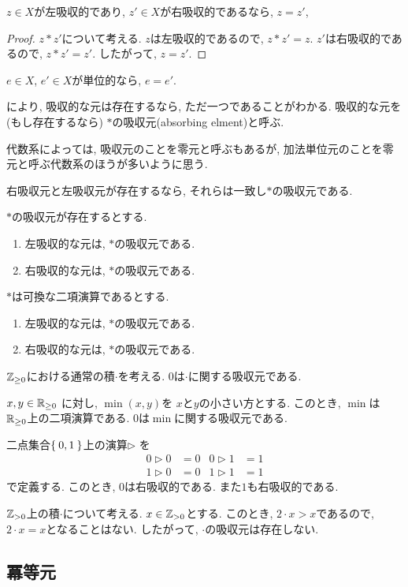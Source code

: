\begin{lemma}
  $z\in X$が左吸収的であり,
  $z'\in X$が右吸収的であるなら,
  $z=z'$,
\end{lemma}
\begin{proof}
  $z\ast z'$について考える.
  $z$は左吸収的であるので, $z\ast z'=z$.
  $z'$は右吸収的であるので, $z\ast z'=z'$.
  したがって, $z=z'$.
\end{proof}
\begin{cor}
\label{cor:uniq:absorbinelm}
  $e\in X$, $e'\in X$が単位的なら,
  $e=e'$.
\end{cor}
\begin{remark}
  により,
  吸収的な元は存在するなら, ただ一つであることがわかる.
  吸収的な元を (もし存在するなら)
  $\ast$の吸収元(absorbing elment)と呼ぶ.

  代数系によっては, 吸収元のことを零元と呼ぶもあるが,
  加法単位元のことを零元と呼ぶ代数系のほうが多いように思う.
\end{remark}
\begin{cor}
  右吸収元と左吸収元が存在するなら,
  それらは一致し$\ast$の吸収元である.
\end{cor}
\begin{cor}
  $\ast$の吸収元が存在するとする.
  \begin{enumerate}
  \item 左吸収的な元は, $\ast$の吸収元である.
  \item 右吸収的な元は, $\ast$の吸収元である.
  \end{enumerate}
\end{cor}
\begin{cor}
  $\ast$は可換な二項演算であるとする.
  \begin{enumerate}
  \item 左吸収的な元は, $\ast$の吸収元である.
  \item 右吸収的な元は, $\ast$の吸収元である.
  \end{enumerate}
\end{cor}
\begin{example}
  $\mathbb{Z}_{\geq 0}$における通常の積$\cdot$を考える.
  $0$は$\cdot$に関する吸収元である.
\end{example}
\begin{example}
  $x,y\in\mathbb{R}_{\geq 0}$
  に対し, $\min(x,y)$を
  $x$と$y$の小さい方とする.
  このとき, $\min$は
  $\mathbb{R}_{\geq 0}$上の二項演算である.
  $0$は$\min$に関する吸収元である.
\end{example}

\begin{example}
  二点集合$\Set{0,1}$上の演算$\rhd$
  を
  \begin{align*}
    0\rhd 0 &= 0&
    0\rhd 1 &= 1\\
    1\rhd 0 &= 0&
    1\rhd 1 &= 1
  \end{align*}
  で定義する.
  このとき, $0$は右吸収的である.
  また$1$も右吸収的である.
\end{example}


\begin{nonexample}
  $\mathbb{Z}_{>0}$上の積$\cdot$について考える.
  $x\in\mathbb{Z}_{>0}$とする.
  このとき, $2\cdot x>x$であるので,
  $2\cdot x=x$となることはない.
  したがって, $\cdot$の吸収元は存在しない.
\end{nonexample}


\subsection{冪等元}
